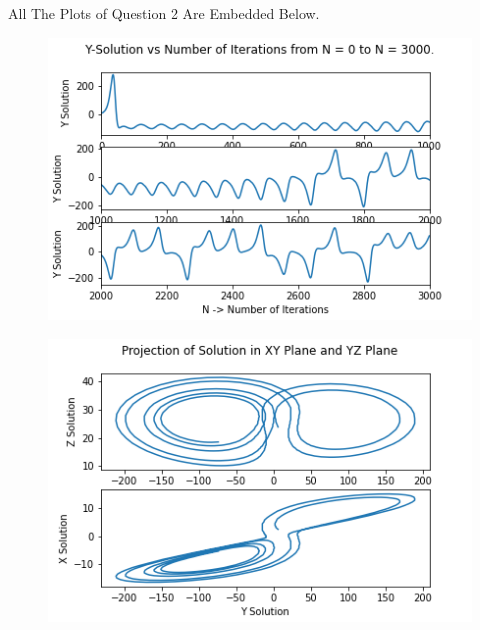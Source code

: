 \documentclass{article}
\begin{document}
All The Plots of Question 2 Are Embedded Below. 

\begin{figure}[!htb]
  \centering
  \includegraphics[width=1\linewidth]{q2_1.png}
  \caption{}
  \label{fig:q2_1.png}
\end{figure}


\begin{figure}[!htb]
  \centering
  \includegraphics[width=1\linewidth]{q2_2.png}
  \caption{}
  \label{fig:q2_2.png}
\end{figure}
\end{document}

